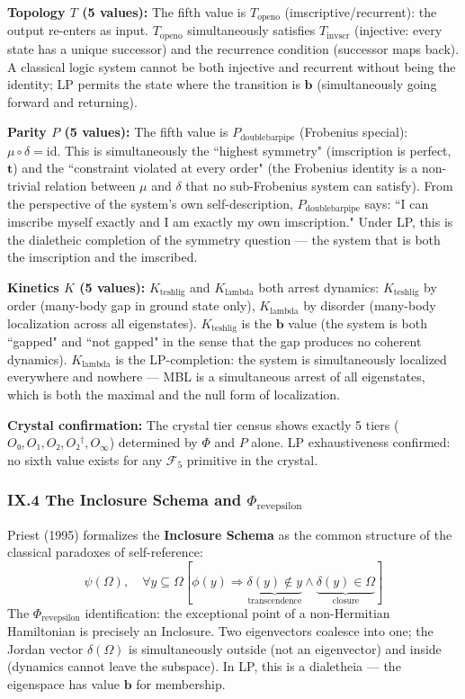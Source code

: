 \documentclass[12pt,a4paper]{article}
\begin{document}
\textbf{Topology $T$ (5 values):}
The fifth value is $T_{\text{openo}}$ (imscriptive/recurrent): the output re-enters as input. $T_{\text{openo}}$ simultaneously satisfies $T_{\text{invscr}}$ (injective: every state has a unique successor) and the recurrence condition (successor maps back). A classical logic system cannot be both injective and recurrent without being the identity; LP permits the state where the transition is $\mathbf{b}$ (simultaneously going forward and returning).

\textbf{Parity $P$ (5 values):}
The fifth value is $P_{\text{doublebarpipe}}$ (Frobenius special): $\mu \circ \delta = \text{id}$. This is simultaneously the ``highest symmetry" (imscription is perfect, $\mathbf{t}$) and the ``constraint violated at every order" (the Frobenius identity is a non-trivial relation between $\mu$ and $\delta$ that no sub-Frobenius system can satisfy). From the perspective of the system's own self-description, $P_{\text{doublebarpipe}}$ says: ``I can imscribe myself exactly and I am exactly my own imscription." Under LP, this is the dialetheic completion of the symmetry question --- the system that is both the imscription and the imscribed.

\textbf{Kinetics $K$ (5 values):}
$K_{\text{teshlig}}$ and $K_{\text{lambda}}$ both arrest dynamics: $K_{\text{teshlig}}$ by order (many-body gap in ground state only), $K_{\text{lambda}}$ by disorder (many-body localization across all eigenstates). $K_{\text{teshlig}}$ is the $\mathbf{b}$ value (the system is both ``gapped" and ``not gapped" in the sense that the gap produces no coherent dynamics). $K_{\text{lambda}}$ is the LP-completion: the system is simultaneously localized everywhere and nowhere --- MBL is a simultaneous arrest of all eigenstates, which is both the maximal and the null form of localization.

\textbf{Crystal confirmation:} The crystal tier census shows exactly 5 tiers ($O₀, O₁, O₂, O₂^\dagger, O_\infty$) determined by $\Phi$ and $P$ alone. LP exhaustiveness confirmed: no sixth value exists for any $\mathcal{F}_5$ primitive in the crystal.

\subsubsection{IX.4 The Inclosure Schema and $\Phi_{\text{revepsilon}}$}
Priest (1995) formalizes the \textbf{Inclosure Schema} as the common structure of the classical paradoxes of self-reference:
\[\psi(\Omega), \quad \forall y \subseteq \Omega \left[\phi(y) \Rightarrow \underbrace{\delta(y) \notin y}_{\text{transcendence}} \wedge \underbrace{\delta(y) \in \Omega}_{\text{closure}}\right]\]
The $\Phi_{\text{revepsilon}}$ identification: the exceptional point of a non-Hermitian Hamiltonian is precisely an Inclosure. Two eigenvectors coalesce into one; the Jordan vector $\delta(\Omega)$ is simultaneously outside (not an eigenvector) and inside (dynamics cannot leave the subspace). In LP, this is a dialetheia --- the eigenspace has value $\mathbf{b}$ for membership.
\end{document}
